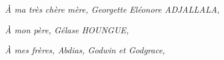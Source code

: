 \dedicace

\vspace*{2cm}
\begin{flushleft}
\large
\textit{À ma très chère mère, Georgette Eléonore ADJALLALA,}\\
\vspace{0.5cm}

\textit{À mon père, Gélase HOUNGUE,}\\
\vspace{0.5cm}

\textit{À mes frères, Abdias, Godwin et Godgrace,}\\

\vspace{1cm}
\end{flushleft}


